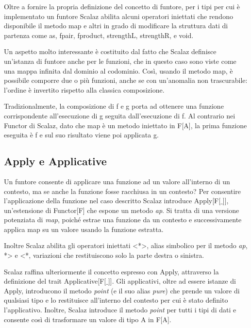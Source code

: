 Oltre a fornire la propria definizione del concetto di funtore, per i tipi per cui è implementato un funtore Scalaz abilita alcuni operatori iniettati che rendono disponibile il metodo map  e altri in grado di modificare la struttura dati di partenza come as, fpair, fproduct, strengthL, strengthR, e void.

Un aspetto molto interessante è costituito dal fatto che Scalaz definisce un'istanza di funtore anche per le funzioni, che in questo caso sono viste come una mappa infinita dal dominio al codominio. Così, usando il metodo map, è possibile comporre due o più funzioni, anche se con un'anomalia non trascurabile: l'ordine è invertito rispetto alla classica composizione.

Tradizionalmente, la composizione di f e g porta ad ottenere una funzione corrispondente all'esecuzione di g seguita dall'esecuzione di f. Al contrario nei Functor di Scalaz, dato che map è un metodo iniettato in F[A], la prima funzione eseguita è f e sul suo risultato viene poi applicata g.



\subsection{Apply e Applicative}

Un funtore consente di applicare una funzione ad un valore all'interno di un contesto, ma se anche la funzione fosse racchiusa in un contesto? Per consentire l'applicazione della funzione nel caso descritto Scalaz introduce Apply[F[$\_$]], un'estensione di Functor[F] che espone un metodo \textit{ap}. Si tratta di una versione potenziata di \textit{map}, poiché estrae una funzione da un contesto e successivamente applica map su un valore usando la funzione estratta. 

Inoltre Scalaz abilita gli operatori iniettati <*>, alias simbolico per il metodo \textit{ap}, *> e <*, variazioni che restituiscono solo la parte destra o sinistra.

Scalaz raffina ulteriormente il concetto espresso con Apply, attraverso la definizione del trait Applicative[F[$\_$]]. Gli applicativi, oltre ad essere istanze di Apply, introducono il metodo \textit{point} (e il suo alias \textit{pure}) che prende un valore di qualsiasi tipo e lo restituisce all'interno del contesto per cui è stato definito l'applicativo. Inoltre, Scalaz introduce il metodo \textit{point} per tutti i tipi di dati e consente così di trasformare un valore di tipo A in F[A].

